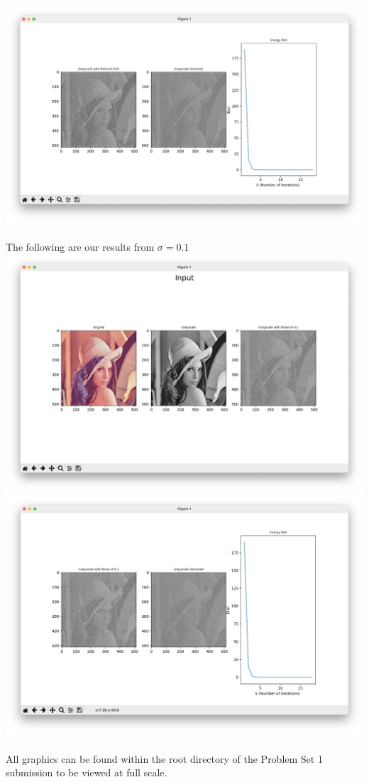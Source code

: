 \documentclass[12pt]{article}
\begin{document}
\includegraphics[scale=0.19]{3 0.05 Noise Out.png}\\\\
\noindent The following are our results from $\sigma = 0.1$\\
\includegraphics[scale=0.18]{3 0.1 Noise In.png}
\includegraphics[scale=0.18]{3 0.1 Noise Out.png}\\\\

\noindent All graphics can be found within the root directory of the Problem Set 1 submission to be viewed at full scale.
\end{document}
